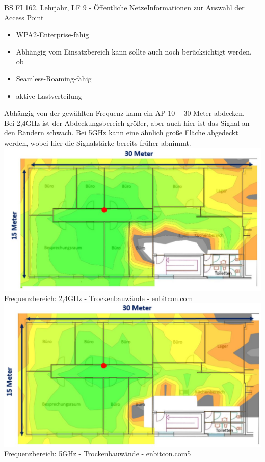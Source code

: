 \documentclass[11pt,twocolumn,oneside,openany,headings=optiontotoc,11pt,numbers=noenddot]{article}
\begin{document}
\begin{worksheet}{BS FI 16}{2. Lehrjahr, LF 9 - Öffentliche Netze}{Informationen zur Auswahl der Access Point}
\begin{itemize}
			\item WPA2-Enterprise-fähig
			\item[] Abhängig vom Einsatzbereich kann sollte auch noch berücksichtigt werden, ob
			\item Seamless-Roaming-fähig
			\item aktive Lastverteilung
		\end{itemize}
		Abhängig von der gewählten Frequenz kann ein AP \(10-30\) Meter abdecken.\\
		Bei 2,4GHz ist der Abdeckungsbereich größer, aber auch hier ist das Signal an den Rändern schwach. Bei 5GHz kann eine ähnlich große Fläche abgedeckt werden, wobei hier die Signalstärke bereits früher abnimmt.\\
		\includegraphics[scale=0.4]{Bilder/2,4ghz.jpg}\\
		\tiny{Frequenzbereich: 2,4GHz - Trockenbauwände - \href{https://www.enbitcon.de/shop/sophos-ap-55-access-point?gclid=EAIaIQobChMI05evyPyx2wIVGp7VCh1IHgJSEAQYAiABEgKC6fD_BwE07}{enbitcon.com}}\normalsize\\
		\includegraphics[scale=0.4]{Bilder/5ghz.jpg}
		\tiny{Frequenzbereich: 5GHz - Trockenbauwände - \href{https://www.enbitcon.de/shop/sophos-ap-55-access-point?gclid=EAIaIQobChMI05evyPyx2wIVGp7VCh1IHgJSEAQYAiABEgKC6fD_BwE07}{enbitcon.com}5}\normalsize\\

\end{worksheet}
\end{document}
